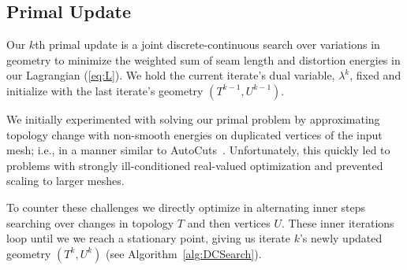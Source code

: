 \subsection{Primal Update}
\label{sec:primalUpdate}
Our $k$th primal update is a joint discrete-continuous search over variations in geometry to minimize the weighted sum of seam length and distortion energies in our Lagrangian (\ref{eq:L}). We hold the current iterate's dual variable, $\lambda^k$, fixed and initialize with the last iterate's geometry $(T^{k-1}, U^{k-1})$.


We initially experimented with solving our primal problem by approximating topology change with non-smooth energies on duplicated vertices of the input mesh; i.e., in a manner similar to AutoCuts\ \cite{Poranne2017Autocuts}. Unfortunately, this quickly led to problems with strongly ill-conditioned real-valued optimization and prevented scaling to larger meshes. 

To counter these challenges we directly optimize in alternating inner steps searching over changes in topology $T$ and then vertices $U$. These inner iterations loop until we 
we reach a stationary point, 
giving us iterate $k$'s newly updated geometry $(T^{k}, U^{k})$ (see Algorithm~\ref{alg:DCSearch}).%


